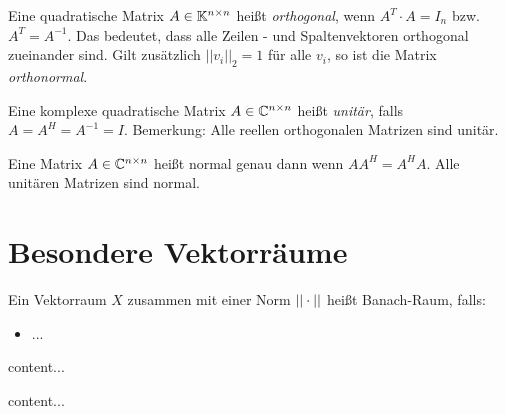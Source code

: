 \begin{definition}
	Eine quadratische Matrix $A \in \mathbb{K}^{n \times n}$ heißt \emph{orthogonal}, wenn $A^T \cdot A = I_n$ bzw. $A^T = A^{-1}$. Das bedeutet, dass alle Zeilen - und Spaltenvektoren orthogonal zueinander sind. Gilt zusätzlich $||v_i||_2 = 1$ für alle $v_i$, so ist die Matrix \emph{orthonormal}.
\end{definition}


\begin{definition}
	Eine komplexe quadratische Matrix $A \in \mathbb{C}^{n \times n}$ heißt \emph{unitär}, falls $A = A^H = A^{-1} = I$. Bemerkung: Alle reellen orthogonalen Matrizen sind unitär.
\end{definition}

\begin{definition}
	Eine Matrix $A \in \mathbb{C}^{n \times n}$ heißt normal genau dann wenn $AA^H = A^HA$. Alle unitären Matrizen sind normal.
\end{definition}

\pagebreak

\section{Besondere Vektorräume}

\begin{definition}
	Ein Vektorraum $X$ zusammen mit einer Norm $||\cdot||$ heißt Banach-Raum, falls:
	\begin{itemize}
		\item ...
	\end{itemize}
\end{definition}


\begin{definition}
	content...
\end{definition}

\begin{definition}
	content...
\end{definition}


